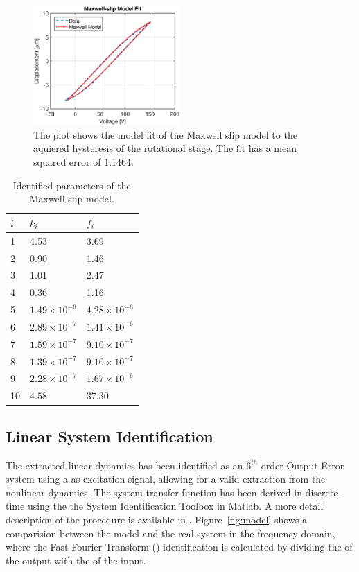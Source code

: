 \begin{figure}[h]
  \centering
  \includegraphics[width=0.5\textwidth]{fig/matlab/maxwell.eps}
  \caption{\label{fig:maxwell} The plot shows the model fit of the Maxwell slip model to the aquiered hysteresis of the rotational stage. The fit has a mean squared error of 1.1464.}
\end{figure}
\begin{table}[h!]
  \centering
  \begin{tabular}{| l | l | l |}
    \hline
    $i$ & $k_i$ & $f_i$ \\ \hline
    1 & 4.53 & 3.69 \\
    2 & 0.90 & 1.46 \\
    3 & 1.01 & 2.47 \\
    4 & 0.36 & 1.16 \\
    5 & $1.49 \times 10^{-6}$ & $4.28 \times 10^{-6}$ \\
    6 & $2.89 \times 10^{-7}$ & $1.41 \times 10^{-6}$ \\
    7 & $1.59 \times 10^{-7}$ & $9.10 \times 10^{-7}$ \\
    8 & $1.39 \times 10^{-7}$ & $9.10 \times 10^{-7}$ \\
    9 & $2.28 \times 10^{-7}$ & $1.67 \times 10^{-6}$ \\
    10 & $4.58$ & 37.30 \\
    \hline
  \end{tabular}
  \caption{\label{tab:maxwell} Identified parameters of the Maxwell slip model.}
\end{table}

\subsection{Linear System Identification}
\label{sec:linsys}
The extracted linear dynamics has been identified as an $6^{th}$ order Output-Error system using a \abbrPRBS as excitation signal, allowing for a valid extraction from the nonlinear dynamics. The system transfer function has been derived in discrete-time using the the System Identification Toolbox in Matlab. A more detail description of the procedure is available in \citep{ButcherController:2015}. Figure~\ref{fig:model} shows a comparision between the model and the real system in the frequency domain, where the Fast Fourier Transform (\abbrFFT) identification is calculated by dividing the \abbrFFT of the output with the \abbrFFT of the input.

